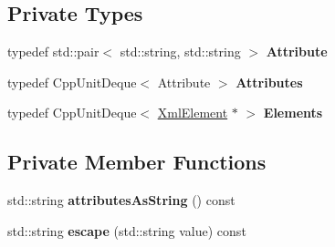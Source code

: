 \subsection*{Private Types}
\begin{DoxyCompactItemize}
\item 
typedef std\+::pair$<$ std\+::string, std\+::string $>$ {\bfseries Attribute}\hypertarget{class_xml_element_ae8e9d69b58c3e04880a901093b436ce3}{}\label{class_xml_element_ae8e9d69b58c3e04880a901093b436ce3}

\item 
typedef Cpp\+Unit\+Deque$<$ Attribute $>$ {\bfseries Attributes}\hypertarget{class_xml_element_ae8acd63004c6da6a5fc86abb7d5ab761}{}\label{class_xml_element_ae8acd63004c6da6a5fc86abb7d5ab761}

\item 
typedef Cpp\+Unit\+Deque$<$ \hyperlink{class_xml_element}{Xml\+Element} $\ast$ $>$ {\bfseries Elements}\hypertarget{class_xml_element_aaf025bf19d42f6e6da835ea19654846c}{}\label{class_xml_element_aaf025bf19d42f6e6da835ea19654846c}

\end{DoxyCompactItemize}
\subsection*{Private Member Functions}
\begin{DoxyCompactItemize}
\item 
std\+::string {\bfseries attributes\+As\+String} () const \hypertarget{class_xml_element_a1492e8bdde13ecd08eccc01e01314a6e}{}\label{class_xml_element_a1492e8bdde13ecd08eccc01e01314a6e}

\item 
std\+::string {\bfseries escape} (std\+::string value) const \hypertarget{class_xml_element_aadef64d788a51076c033e66a7efdc41d}{}\label{class_xml_element_aadef64d788a51076c033e66a7efdc41d}

\end{DoxyCompactItemize}
